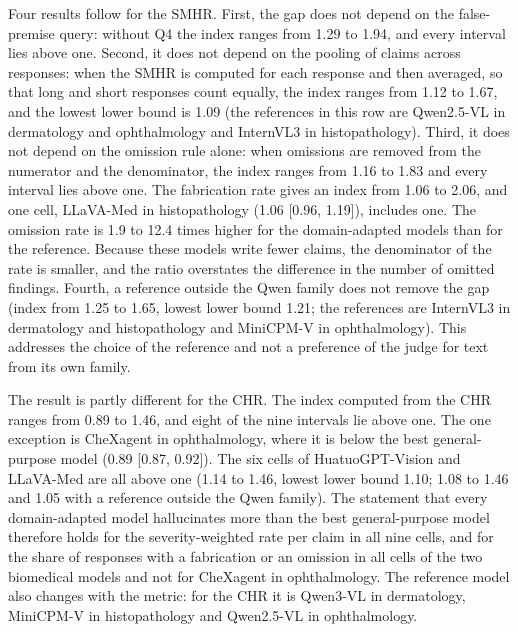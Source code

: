 \documentclass[11pt,a4paper]{article}
\newcommand{\SMHR}{\ensuremath{\mathrm{SMHR}}}
\newcommand{\CHR}{\ensuremath{\mathrm{CHR}}}
\begin{document}
Four results follow for the \SMHR{}. First, the gap does not depend on the false-premise query: without Q4 the index ranges from 1.29 to 1.94, and every interval lies above one. Second, it does not depend on the pooling of claims across responses: when the \SMHR{} is computed for each response and then averaged, so that long and short responses count equally, the index ranges from 1.12 to 1.67, and the lowest lower bound is 1.09 (the references in this row are Qwen2.5-VL in dermatology and ophthalmology and InternVL3 in histopathology). Third, it does not depend on the omission rule alone: when omissions are removed from the numerator and the denominator, the index ranges from 1.16 to 1.83 and every interval lies above one. The fabrication rate gives an index from 1.06 to 2.06, and one cell, LLaVA-Med in histopathology (1.06 [0.96, 1.19]), includes one. The omission rate is 1.9 to 12.4 times higher for the domain-adapted models than for the reference. Because these models write fewer claims, the denominator of the rate is smaller, and the ratio overstates the difference in the number of omitted findings. Fourth, a reference outside the Qwen family does not remove the gap (index from 1.25 to 1.65, lowest lower bound 1.21; the references are InternVL3 in dermatology and histopathology and MiniCPM-V in ophthalmology). This addresses the choice of the reference and not a preference of the judge for text from its own family.

The result is partly different for the \CHR{}. The index computed from the \CHR{} ranges from 0.89 to 1.46, and eight of the nine intervals lie above one. The one exception is CheXagent in ophthalmology, where it is below the best general-purpose model (0.89 [0.87, 0.92]). The six cells of HuatuoGPT-Vision and LLaVA-Med are all above one (1.14 to 1.46, lowest lower bound 1.10; 1.08 to 1.46 and 1.05 with a reference outside the Qwen family). The statement that every domain-adapted model hallucinates more than the best general-purpose model therefore holds for the severity-weighted rate per claim in all nine cells, and for the share of responses with a fabrication or an omission in all cells of the two biomedical models and not for CheXagent in ophthalmology. The reference model also changes with the metric: for the \CHR{} it is Qwen3-VL in dermatology, MiniCPM-V in histopathology and Qwen2.5-VL in ophthalmology.
\end{document}
